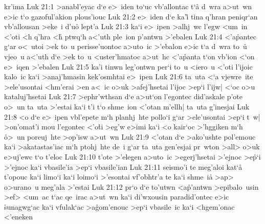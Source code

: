 kr'ima\bibvsend
\vs Luk 21:1
>anabl'eyac
d`e
e>~iden
to`uc
vb'allontac
t`a\r{}
d~wra
a>ut~wn
e>ic
t`o
gazoful'akion
plous'iouc\bibvsend
\vs Luk 21:2
e>~iden
d`e
ka'i\r{}
tina
q'hran
peniqr`an
vb'allousan
>eke~i
d'uo\r{}
lept'a\bibvsend
\vs Luk 21:3
ka`i
e>~ipen
>alhj~wc
l'egw
<um~in
<'oti
<h
q'hra
<h\r{}
ptwq`h
a<'uth
ple~ion
p'antwn
>'ebalen\bibvsend
\vs Luk 21:4
<'a\r{p}antec
g`ar
o<~utoi
>ek
to~u
perisse'uontoc
a>uto~ic
>'ebalon
e>ic
t`a
d~wra
to~u\r{}
vjeo~u
a<'uth
d`e
>ek
to~u
<uster'hmatoc
a>ut~hc
<'a\r{p}an\-ta
t`on
vb'ion
<`on
e>~iqen
>'ebalen\bibvsend
\vs Luk 21:5
ka'i
tinwn
leg'ontwn
per`i
to~u
<iero~u
<'oti
l'ijoic
kalo~ic
ka`i
>anaj'hmasin
kek'osmhtai
e>~ipen\bibvsend
\vs Luk 21:6
ta~uta
<`a
vjewre~ite
>ele'usontai
<hm'erai
>en
a<~ic
o>uk
>afej'hsetai
l'ijoc
>ep`i
l'ijw|
<`oc
o>u
kataluj'hsetai\bibvsend
\vs Luk 21:7
>ephr'wthsan
d`e
a>ut`on
l'egontec
did'askale
p'ote
o>~un
ta~uta
>'estai
ka`i
t'i
t`o
shme~ion
<'otan
m'ellh|
ta~uta
g'inesjai\bibvsend
\vs Luk 21:8
<o
d`e
e>~ipen
vbl'epete
m`h
planhj~hte
pollo`i
g`ar
>ele'usontai
>ep`i
t~w|
>on'omat'i
mou
l'egontec
<'o\r{t}i
>eg'w
e>imi
ka`i
<o
kair`oc
>'hggiken
m`h
\r{o}>~un
poreuj~hte
>op'isw
a>ut~wn\bibvsend
\vs Luk 21:9
<'otan
d`e
>ako'ushte
pol'emouc
ka`i
>akatastas'iac
m`h
ptohj~hte
de~i
g`ar
ta~uta
gen'esjai
pr~wton
>all>
o>uk
e>uj'ewc
t`o
t'eloc\bibvsend
\vs Luk 21:10
t'ote
>'elegen
a>uto~ic
>egerj'hsetai
>'ejnoc
>e\r{p}`i
>'ejnoc
ka`i
vbasile'ia
>ep`i
vbasile'ian\bibvsend
\vs Luk 21:11
seismo'i
te
meg'aloi
kat`a\r{}
t'opouc
ka`i
limo`i
ka`i
loimo`i
>'esontai
vf'obhtr'a
te
ka`i
shme~ia\r{}
>ap>
o>urano~u
meg'ala
>'estai\bibvsend
\vs Luk 21:12
pr`o
d`e
to'utwn
<a\r{p}'antwn
>epibalo~usin
>ef>
<um~ac
t`ac
qe~irac
a>ut~wn
ka`i
di'wxousin
paradid'ontec
e>ic
\r{s}unagwg`ac
ka`i
vfulak`ac
>a\r{g}om'enouc
>ep`i
vbasile~ic
ka`i
<hgem'onac
<'eneken
